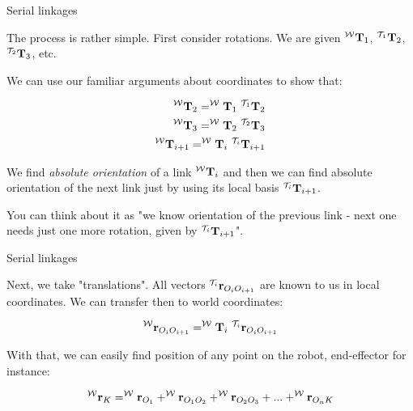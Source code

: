 \documentclass{beamer}
\begin{document}
\begin{frame}{Serial linkages}
	\begin{flushleft}
		
		The process is rather simple. First consider rotations. We are given $^{\mathcal W}\mathbf{T}_1$, $^{\mathcal T_1}\mathbf{T}_2$, $^{\mathcal T_2}\mathbf{T}_3$, etc.
		
		\bigskip
		
		We can use our familiar arguments about coordinates to show that:
		
		\begin{align}
			^{\mathcal W} \bo{T}_2 = 	^{\mathcal W} \bo{T}_1  \ ^{\mathcal T_1}\bo{T}_2 \\
			^{\mathcal W} \bo{T}_3 = 	^{\mathcal W} \bo{T}_2 \ ^{\mathcal T_2}\bo{T}_3\\
			^{\mathcal W} \bo{T}_{i+1} = 	^{\mathcal W} \bo{T}_i \ ^{\mathcal T_i}\bo{T}_{i+1}
		\end{align}
	
	We find \emph{absolute orientation} of a link $^{\mathcal W} \mathbf{T}_i$ and then we can find absolute orientation of the next link just by using its local basis  $^{\mathcal T_i}\mathbf{T}_{i+1}$.
	
	You can think about it as "we know orientation of the previous link - next one needs just one more rotation, given by $^{\mathcal T_i}\mathbf{T}_{i+1}$".
		
	\end{flushleft}
\end{frame}



\begin{frame}{Serial linkages}
	\begin{flushleft}
		
		Next, we take "translations". All vectors $^{\mathcal T_i}\mathbf{r}_{O_i O_{i+1}}$ are known to us in local coordinates. We can transfer then to world coordinates:
		
		\begin{equation}
			^{\mathcal W}\mathbf{r}_{O_i O_{i+1}} = ^{\mathcal W} \mathbf{T}_i \  ^{\mathcal T_i}\mathbf{r}_{O_i O_{i+1}}
		\end{equation}
	
	With that, we can easily find position of any point on the robot, end-effector for instance:
	
		\begin{equation}
	^{\mathcal W}\mathbf{r}_K = 
	^{\mathcal W}\mathbf{r}_{O_1} +
	^{\mathcal W}\mathbf{r}_{O_1 O_2} +
	^{\mathcal W}\mathbf{r}_{O_2 O_3} + ... +
	^{\mathcal W}\mathbf{r}_{O_n K}
		\end{equation}	
		
	\end{flushleft}
\end{frame}
\end{document}
